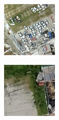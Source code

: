 \begin{figure} [H]
\begin{subfigure}{.275\textwidth}
	\end{subfigure}
	\begin{subfigure}{.275\textwidth}
		\centering
		\includegraphics[width=.95\linewidth]{figs/3.jpg}
	\end{subfigure}
	\par\medskip
	\begin{subfigure}{.275\textwidth}
		\centering
		\includegraphics[width=.95\linewidth]{figs/4.jpg}

\end{subfigure}
\end{figure}
